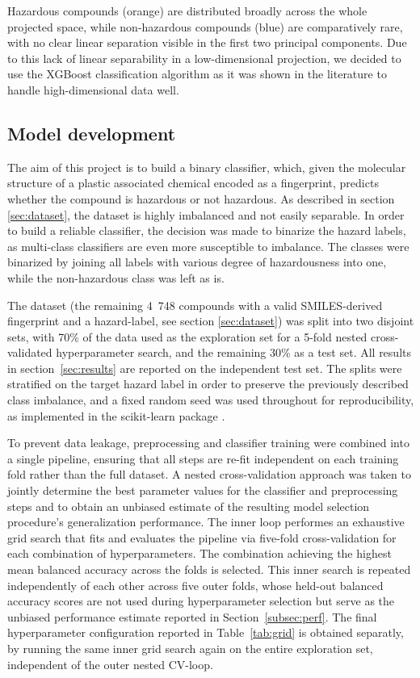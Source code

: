 \documentclass[hidelinks,11pt]{article}
\begin{document}
Hazardous compounds (orange) are distributed broadly across the whole projected space, 
while non-hazardous compounds (blue) are comparatively rare, with no clear linear separation 
visible in the first two principal components.
Due to this lack of linear separability in a low-dimensional projection, we decided to use the 
XGBoost classification algorithm as it was shown in the literature to handle high-dimensional data well.

\subsection{Model development} \label{sec:approach}
The aim of this project is to build a binary classifier, which, given the molecular structure of a plastic 
associated chemical encoded as a fingerprint,
predicts whether the compound is hazardous or not hazardous.
As described in section \ref{sec:dataset}, the dataset is highly imbalanced and not easily separable.
In order to build a reliable classifier, the decision was made to binarize the hazard labels, 
as multi-class classifiers are even more susceptible to imbalance.
The classes were binarized by joining all labels with various degree of hazardousness into one,
while the non-hazardous class was left as is.

The dataset (the remaining 4~748 compounds with a valid SMILES-derived fingerprint and a hazard-label, 
see section \ref{sec:dataset}) was split into two disjoint sets, with 70\% of the data used as 
the exploration set for a 5-fold nested cross-validated hyperparameter search, and
the remaining 30\% as a test set.
All results in section~\ref{sec:results} are reported on the independent test set.
The splits were stratified on the target hazard label in order to preserve the previously described 
class imbalance, and a fixed random seed was used throughout for reproducibility, as implemented in the 
scikit-learn package \parencite{pedregosaScikitlearnMachineLearning2011}.

To prevent data leakage, preprocessing and classifier training were combined into a single pipeline, ensuring
that all steps are re-fit independent on each training fold rather than the full dataset.
A nested cross-validation approach was taken to jointly determine the best parameter values for the classifier and
preprocessing steps and to obtain an unbiased estimate of the resulting model selection procedure's generalization
performance\parencite{cawleyOverfittingModelSelection2010}. 
The inner loop performes an exhaustive grid search that fits and evaluates the pipeline via five-fold cross-validation
for each combination of hyperparameters.
The combination achieving the highest mean balanced accuracy across the folds is selected.
This inner search is repeated independently of each other across five outer folds, whose held-out balanced accuracy scores are not 
used during hyperparameter selection but serve as the unbiased performance estimate reported in Section~\ref{subsec:perf}.
The final hyperparameter configuration reported in Table~\ref{tab:grid} is obtained separatly, by running the
same inner grid search again on the entire exploration set, independent of the outer nested CV-loop.
\end{document}
